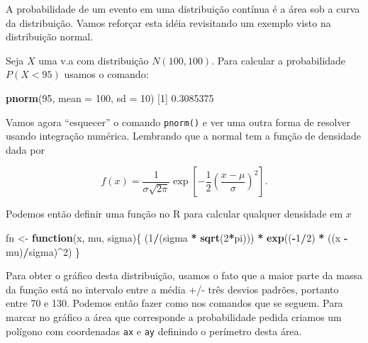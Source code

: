 \documentclass[10pt,a4paper]{book}
\newenvironment{Shaded}{\begin{snugshade}}{\end{snugshade}}
\newcommand{\KeywordTok}[1]{\textcolor[rgb]{0.13,0.29,0.53}{\textbf{#1}}}
\newcommand{\DataTypeTok}[1]{\textcolor[rgb]{0.13,0.29,0.53}{#1}}
\newcommand{\DecValTok}[1]{\textcolor[rgb]{0.00,0.00,0.81}{#1}}
\newcommand{\FloatTok}[1]{\textcolor[rgb]{0.00,0.00,0.81}{#1}}
\newcommand{\StringTok}[1]{\textcolor[rgb]{0.31,0.60,0.02}{#1}}
\newcommand{\ControlFlowTok}[1]{\textcolor[rgb]{0.13,0.29,0.53}{\textbf{#1}}}
\newcommand{\OperatorTok}[1]{\textcolor[rgb]{0.81,0.36,0.00}{\textbf{#1}}}
\newcommand{\NormalTok}[1]{#1}
\begin{document}
A probabilidade de um evento em uma distribuição contínua é a área sob a
curva da distribuição. Vamos reforçar esta idéia revisitando um exemplo
visto na distribuição normal.

Seja \(X\) uma v.a com distribuição \(N(100, 100)\). Para calcular a
probabilidade \(P(X < 95)\) usamos o comando:

\begin{Shaded}
\begin{Highlighting}[]
\KeywordTok{pnorm}\NormalTok{(}\DecValTok{95}\NormalTok{, }\DataTypeTok{mean =} \DecValTok{100}\NormalTok{, }\DataTypeTok{sd =} \DecValTok{10}\NormalTok{)}
\NormalTok{[}\DecValTok{1}\NormalTok{] }\FloatTok{0.3085375}
\end{Highlighting}
\end{Shaded}

Vamos agora ``esquecer'' o comando \texttt{pnorm()} e ver uma outra
forma de resolver usando integração numérica. Lembrando que a normal tem
a função de densidade dada por

\[
f(x) = \frac{1}{\sigma\sqrt{2 \pi}}\exp \left[ -\frac{1}{2}
    \left( \frac{x - \mu}{\sigma} \right)^2 \right].
\]

Podemos então definir uma função no R para calcular qualquer densidade
em \(x\)

\begin{Shaded}
\begin{Highlighting}[]
\NormalTok{fn <-}\StringTok{ }\ControlFlowTok{function}\NormalTok{(x, mu, sigma)\{}
\NormalTok{    (}\DecValTok{1}\OperatorTok{/}\NormalTok{(sigma }\OperatorTok{*}\StringTok{ }\KeywordTok{sqrt}\NormalTok{(}\DecValTok{2}\OperatorTok{*}\NormalTok{pi))) }\OperatorTok{*}\StringTok{ }\KeywordTok{exp}\NormalTok{((}\OperatorTok{-}\DecValTok{1}\OperatorTok{/}\DecValTok{2}\NormalTok{) }\OperatorTok{*}\StringTok{ }\NormalTok{((x }\OperatorTok{-}\StringTok{ }\NormalTok{mu)}\OperatorTok{/}\NormalTok{sigma)}\OperatorTok{^}\DecValTok{2}\NormalTok{)}
\NormalTok{\}}
\end{Highlighting}
\end{Shaded}

Para obter o gráfico desta distribuição, usamos o fato que a maior parte
da massa da função está no intervalo entre a média +/- três desvios
padrões, portanto entre 70 e 130. Podemos então fazer como nos comandos
que se seguem. Para marcar no gráfico a área que corresponde a
probabilidade pedida criamos um polígono com coordenadas \texttt{ax} e
\texttt{ay} definindo o perímetro desta área.
\end{document}
